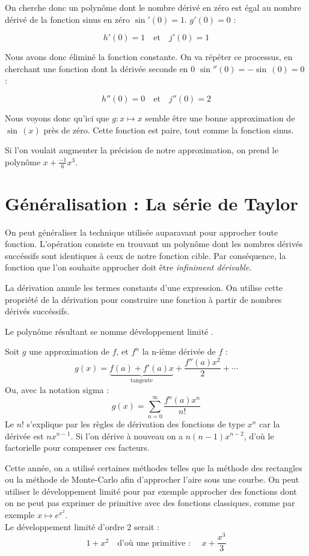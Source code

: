 \documentclass[DIV=12]{scrartcl}
\begin{document}
    On cherche donc un polynôme dont le nombre dérivé en zéro est égal au nombre dérivé de la fonction sinus en zéro $\sin'(0)=1$. $g'(0)=0$ :
    
    \[h'(0)=1\quad\text{et}\quad j'(0)=1\]

    Nous avons donc éliminé la fonction constante. On va répéter ce processus, en cherchant une fonction dont la dérivée seconde en 0 $\sin''(0)=-\sin\,(0)=0$ :
    
    \[h''(0)=0\quad\text{et}\quad j''(0)=2\]

    Nous voyons donc qu'ici que $g:x\mapsto x$ semble être une bonne approximation de~$\sin\,(x)$ près de zéro. Cette fonction est paire, tout comme la fonction sinus.

    Si l'on voulait augmenter la précision de notre approximation, on prend le polynôme $x+\frac{-1}{6}x^3$.

    \section{Généralisation : La série de Taylor}
    On peut généraliser la technique utilisée auparavant pour approcher toute fonction. L'opération consiste en trouvant un polynôme dont les nombres dérivés succéssifs sont identiques à ceux de notre fonction cible. Par conséquence, la fonction que l'on souhaite approcher doit être \emph{infiniment dérivable}.

    La dérivation annule les termes constants d'une expression. On utilise cette propriété de la dérivation pour construire une fonction à partir de nombres dérivés succéssifs.

    Le polynôme résultant se nomme \og développement limité \fg{}.

    Soit $g$ une approximation de $f$, et $f^n$ la n-ième dérivée de $f$ : \[g(x)=\underbrace{f(a)+f'(a)x}_\text{tangente}+\frac{f''(a)x^2}{2}+\dotsb\] Ou, avec la notation sigma : \[g(x)=\sum_{n=0}^{\infty}\frac{f^n(a)x^n}{n!}\]
    Le $n!$ s'explique par les règles de dérivation des fonctions de type $x^n$ car la dérivée est $nx^{n-1}$. Si l'on dérive à nouveau on a $n(n-1)x^{n-2}$, d'où le factorielle pour compenser ces facteurs.

    Cette année, on a utilisé certaines méthodes telles que la méthode des rectangles ou la méthode de Monte-Carlo afin d'approcher l'aire sous une courbe. On peut utiliser le développement limité pour par exemple approcher des fonctions dont on ne peut pas exprimer de primitive avec des fonctions classiques, comme par exemple $x\mapsto e^{x^2}$. \\ Le développement limité d'ordre 2 serait : \[1+x^2\quad\text{d'où une primitive : }\quad x+\frac{x^3}{3}\]
\end{document}
